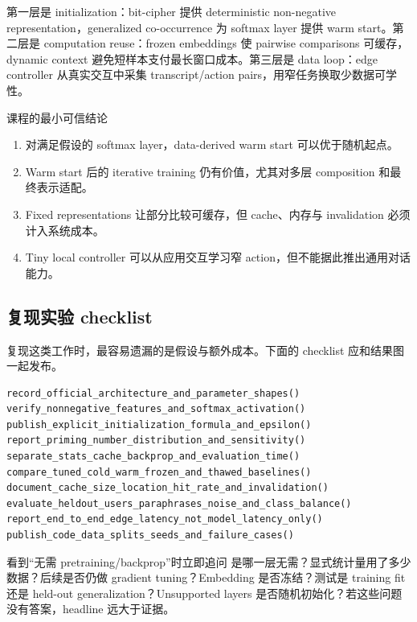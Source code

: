 \documentclass[a4paper]{article}
\begin{document}
第一层是 initialization：bit-cipher 提供 deterministic non-negative representation，generalized co-occurrence 为 softmax layer 提供 warm start。第二层是 computation reuse：frozen embeddings 使 pairwise comparisons 可缓存，dynamic context 避免短样本支付最长窗口成本。第三层是 data loop：edge controller 从真实交互中采集 transcript/action pairs，用窄任务换取少数据可学性。

\begin{importantbox}{课程的最小可信结论}
\begin{enumerate}
  \item 对满足假设的 softmax layer，data-derived warm start 可以优于随机起点。
  \item Warm start 后的 iterative training 仍有价值，尤其对多层 composition 和最终表示适配。
  \item Fixed representations 让部分比较可缓存，但 cache、内存与 invalidation 必须计入系统成本。
  \item Tiny local controller 可以从应用交互学习窄 action，但不能据此推出通用对话能力。
\end{enumerate}
\end{importantbox}

\subsection{复现实验 checklist}

复现这类工作时，最容易遗漏的是假设与额外成本。下面的 checklist 应和结果图一起发布。

\begin{lstlisting}[caption={SAFFU/PLM 复现与发布清单}]
record_official_architecture_and_parameter_shapes()
verify_nonnegative_features_and_softmax_activation()
publish_explicit_initialization_formula_and_epsilon()
report_priming_number_distribution_and_sensitivity()
separate_stats_cache_backprop_and_evaluation_time()
compare_tuned_cold_warm_frozen_and_thawed_baselines()
document_cache_size_location_hit_rate_and_invalidation()
evaluate_heldout_users_paraphrases_noise_and_class_balance()
report_end_to_end_edge_latency_not_model_latency_only()
publish_code_data_splits_seeds_and_failure_cases()
\end{lstlisting}

\begin{warningbox}{看到“无需 pretraining/backprop”时立即追问}
是哪一层无需？显式统计量用了多少数据？后续是否仍做 gradient tuning？Embedding 是否冻结？测试是 training fit 还是 held-out generalization？Unsupported layers 是否随机初始化？若这些问题没有答案，headline 远大于证据。
\end{warningbox}
\end{document}
